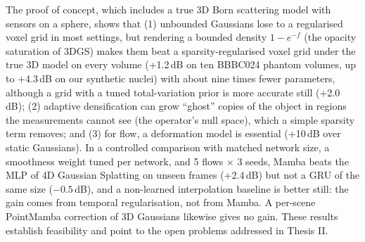 \documentclass[12pt,a4paper,oneside]{report}
\begin{document}
The proof of concept, which includes a true 3D Born scattering model with sensors on a sphere, shows that (1)
unbounded Gaussians lose to a regularised voxel grid in most settings, but rendering a bounded density
$1-e^{-f}$ (the opacity saturation of 3DGS) makes them beat a sparsity-regularised voxel grid under the true 3D model
on every volume (+1.2\,dB on ten BBBC024 phantom volumes, up to +4.3\,dB on our synthetic nuclei) with about nine
times fewer parameters, although a grid with a tuned total-variation prior is more accurate still (+2.0\,dB); (2) adaptive densification can grow ``ghost'' copies of the object in regions the measurements cannot see
(the operator's null space), which a simple sparsity term removes; and (3) for flow, a deformation model is
essential (+10\,dB over static Gaussians). In a controlled comparison with matched network size, a smoothness weight
tuned per network, and 5 flows $\times$ 3 seeds, Mamba beats the MLP of 4D Gaussian Splatting on unseen frames
(+2.4\,dB) but not a GRU of the same size ($-0.5$\,dB), and a non-learned interpolation baseline is better still:
the gain comes from temporal regularisation, not from Mamba. A per-scene PointMamba correction of 3D Gaussians
likewise gives no gain. These results establish feasibility and point to the open problems addressed in Thesis II.

\tableofcontents
\listoffigures
\listoftables

\clearpage
{}














\appendix

\end{document}
